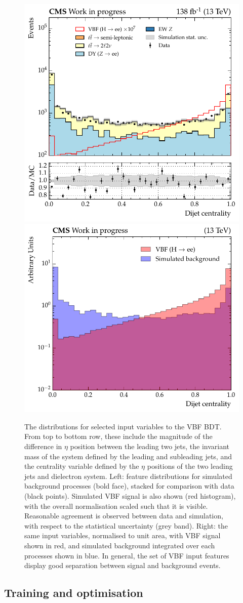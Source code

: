\begin{figure}[htbp!]
\includegraphics[trim={-5mm 0mm 0mm 0mm},clip,width =0.413\linewidth]{Figures/Hee/VBF/dataMC/VBF_BDT_dijetCentrality.pdf}\hfill%
\includegraphics[width =0.45\linewidth]{Figures/Hee/VBF/normed/VBF_BDT_dijetCentrality_normalised.pdf}\hfill%

\caption[Distributions of selected input variables to the VBF BDT.]{The distributions for selected input variables to the VBF BDT. From top to bottom row, these include the magnitude of the difference in $\eta$ position between the leading two jets, the invariant mass of the system defined by the leading and subleading jets, and the centrality variable defined by the $\eta$ positions of the two leading jets and dielectron system. Left: feature distributions for simulated background processes (bold face), stacked for comparison with data (black points). Simulated VBF signal is also shown (red histogram), with the overall normalisation scaled such that it is visible. Reasonable agreement is observed between data and simulation, with respect to the statistical uncertainty (grey band). Right: the same input variables, normalised to unit area, with VBF signal shown in red, and simulated background integrated over each processes shown in blue. In general, the set of VBF input features display good separation between signal and background events.}
\label{fig:vbf_inputs}                                 
\end{figure}   


\subsection{Training and optimisation}

